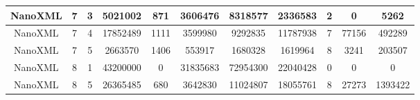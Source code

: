 \begin{table*}[]
\begin{tabular}{@{}ccccccccccc@{}}
        NanoXML                                                  & 7                                                          & 3    & 5021002                                                     & 871                                                                       & 3606476                                                 & 8318577                                                    & 2336583                                                        & 2                                                         & 0                                                         & 5262    \\ \midrule
        NanoXML                                                  & 7                                                          & 4    & 17852489                                                    & 1111                                                                      & 3599980                                                 & 9292835                                                    & 11787938                                                       & 7                                                         & 77156                                                     & 492289  \\ \midrule
        NanoXML                                                  & 7                                                          & 5    & 2663570                                                     & 1406                                                                      & 553917                                                  & 1680328                                                    & 1619964                                                        & 8                                                         & 3241                                                      & 203507  \\ \midrule
        NanoXML                                                  & 8                                                          & 1    & 43200000                                                    & 0                                                                         & 31835683                                                & 72954300                                                   & 22040428                                                       & 0                                                         & 0                                                         & 0       \\ \midrule
        NanoXML                                                  & 8                                                          & 5    & 26365485                                                    & 680                                                                       & 3642830                                                 & 11024807                                                   & 18055761                                                       & 8                                                         & 27273                                                     & 1393422 \\ \midrule

\end{tabular}
\end{table*}
